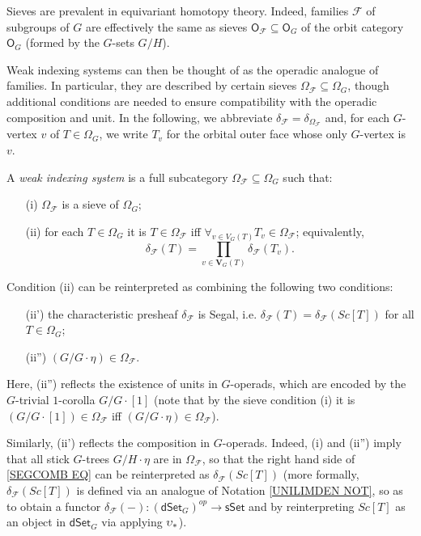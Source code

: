 \documentclass[a4paper,10pt
,draft
]{article}%
\begin{document}
Sieves are prevalent in equivariant homotopy theory. Indeed, families $\mathcal{F}$ of subgroups of $G$ are effectively the same as sieves $\mathsf{O}_{\mathcal{F}} \subseteq \mathsf{O}_G$
of the orbit category
$\mathsf{O}_G$ (formed by the $G$-sets $G/H$).

Weak indexing systems can then be thought of as the operadic analogue of families. In particular, they are described by certain sieves $\Omega_{\mathcal{F}} \subseteq \Omega_G$,
though additional conditions are needed to ensure compatibility with the operadic composition and unit.
In the following, we abbreviate 
$\delta_{\mathcal{F}} = \delta_{\Omega_{\mathcal{F}}}$ and,
for each $G$-vertex $v$ of $T \in \Omega_G$, we write 
$T_v$ for the orbital outer face whose only
$G$-vertex is $v$.

\begin{definition}
A \textit{weak indexing system} is a full subcategory
$\Omega_{\mathcal{F}} \subseteq \Omega_G$ such that:
\begin{itemize}
	\item[(i)] $\Omega_{\mathcal{F}}$ is a sieve of 
              $\Omega_G$;              
	\item[(ii)] for each $T \in \Omega_G$ it is
	$T \in \Omega_{\mathcal{F}}$ iff 
	$\forall_{v \in V_G(T)} T_v \in \Omega_{\mathcal{F}}$;
	equivalently,
        \begin{equation}\label{SEGCOMB EQ}
              \delta_{\mathcal{F}}(T) =
              \prod_{v \in \boldsymbol{V}_G(T)}\delta_{\mathcal{F}}(T_v).
        \end{equation}
\end{itemize}
\end{definition}


\begin{remark}\label{SEGCOMB REM}
	Condition (ii) can be reinterpreted as combining the following two conditions:
\begin{itemize}
	\item[(ii')] the characteristic presheaf $\delta_{\mathcal{F}}$ is Segal, i.e. 
	$\delta_{\mathcal{F}}(T) = 
	\delta_{\mathcal{F}}(Sc[T])$
	for all $T \in \Omega_G$;
	\item[(ii'')] $(G/G \cdot \eta) \in \Omega_{\mathcal{F}}$.
\end{itemize}

Here, (ii'') reflects the existence of units in $G$-operads,
which are encoded by the
$G$-trivial $1$-corolla $G/G\cdot [1]$
(note that by the sieve condition (i) it is
$(G/G\cdot [1]) \in \Omega_{\mathcal{F}}$
iff 
$(G/G\cdot \eta) \in \Omega_{\mathcal{F}}$).

Similarly, (ii') reflects the composition in $G$-operads.
Indeed, (i) and (ii'') imply that
all stick $G$-trees $G/H \cdot \eta$ are in 
$\Omega_{\mathcal{F}}$,
so that the right hand side of \eqref{SEGCOMB EQ}
can be reinterpreted as $\delta_{\mathcal{F}}(Sc[T])$
(more formally, $\delta_{\mathcal{F}}(Sc[T])$ is defined via an analogue of 
Notation \ref{UNILIMDEN NOT}, 
so as to obtain a functor
$\delta_{\mathcal{F}}(-) \colon 
(\mathsf{dSet}_G)^{op} \to \mathsf{sSet}$ 
and by reinterpreting $Sc[T]$ as an object in 
$\mathsf{dSet}_G$ via applying $\upsilon_{\**}$).
\end{remark}
\end{document}
